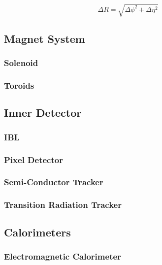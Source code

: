 \begin{equation}
\label{eq:cern:dR}
\Delta R = \sqrt{ \Delta \phi^2 + \Delta \eta^2  }
\end{equation}




\subsection{Magnet System}
\label{sec:cern:atlasmagnets}

\subsubsection*{Solenoid}

\subsubsection*{Toroids}



\subsection{Inner Detector}

\subsubsection*{IBL}

\subsubsection*{Pixel Detector}


\subsubsection*{Semi-Conductor Tracker}


\subsubsection*{Transition Radiation Tracker}



\subsection{Calorimeters}

\subsubsection*{Electromagnetic Calorimeter}


